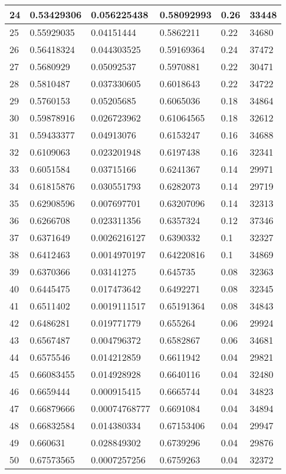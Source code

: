 \begin{longtable}{|l|l|l|l|l|l|}
24 & 0.53429306 & 0.056225438 & 0.58092993 & 0.26 & 33448 \\ \hline 
25 & 0.55929035 & 0.04151444 & 0.5862211 & 0.22 & 34680 \\ \hline 
26 & 0.56418324 & 0.044303525 & 0.59169364 & 0.24 & 37472 \\ \hline 
27 & 0.5680929 & 0.05092537 & 0.5970881 & 0.22 & 30471 \\ \hline 
28 & 0.5810487 & 0.037330605 & 0.6018643 & 0.22 & 34722 \\ \hline 
29 & 0.5760153 & 0.05205685 & 0.6065036 & 0.18 & 34864 \\ \hline 
30 & 0.59878916 & 0.026723962 & 0.61064565 & 0.18 & 32612 \\ \hline 
31 & 0.59433377 & 0.04913076 & 0.6153247 & 0.16 & 34688 \\ \hline 
32 & 0.6109063 & 0.023201948 & 0.6197438 & 0.16 & 32341 \\ \hline 
33 & 0.6051584 & 0.03715166 & 0.6241367 & 0.14 & 29971 \\ \hline 
34 & 0.61815876 & 0.030551793 & 0.6282073 & 0.14 & 29719 \\ \hline 
35 & 0.62908596 & 0.007697701 & 0.63207096 & 0.14 & 32313 \\ \hline 
36 & 0.6266708 & 0.023311356 & 0.6357324 & 0.12 & 37346 \\ \hline 
37 & 0.6371649 & 0.0026216127 & 0.6390332 & 0.1 & 32327 \\ \hline 
38 & 0.6412463 & 0.0014970197 & 0.64220816 & 0.1 & 34869 \\ \hline 
39 & 0.6370366 & 0.03141275 & 0.645735 & 0.08 & 32363 \\ \hline 
40 & 0.6445475 & 0.017473642 & 0.6492271 & 0.08 & 32345 \\ \hline 
41 & 0.6511402 & 0.0019111517 & 0.65191364 & 0.08 & 34843 \\ \hline 
42 & 0.6486281 & 0.019771779 & 0.655264 & 0.06 & 29924 \\ \hline 
43 & 0.6567487 & 0.004796372 & 0.6582867 & 0.06 & 34681 \\ \hline 
44 & 0.6575546 & 0.014212859 & 0.6611942 & 0.04 & 29821 \\ \hline 
45 & 0.66083455 & 0.014928928 & 0.6640116 & 0.04 & 32480 \\ \hline 
46 & 0.6659444 & 0.000915415 & 0.6665744 & 0.04 & 34823 \\ \hline 
47 & 0.66879666 & 0.00074768777 & 0.6691084 & 0.04 & 34894 \\ \hline 
48 & 0.66832584 & 0.014380334 & 0.67153406 & 0.04 & 29947 \\ \hline 
49 & 0.660631 & 0.028849302 & 0.6739296 & 0.04 & 29876 \\ \hline 
50 & 0.67573565 & 0.0007257256 & 0.6759263 & 0.04 & 32372 \\ \hline 
\end{longtable}
